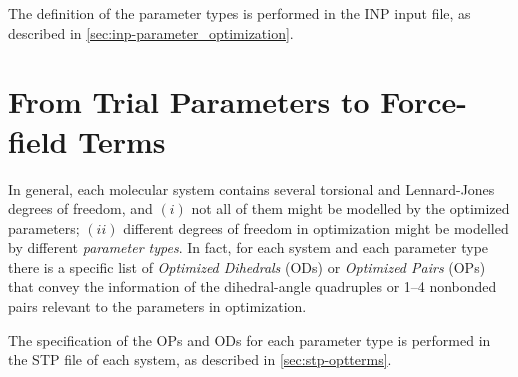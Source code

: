\documentclass[10pt,a4paper,openany]{memoir}
\numberwithin{equation}{section}
\newcommand{\profileropt}[0]{\texttt{profilerOpt}}
\newcommand{\profilergen}[0]{\texttt{profilerGen}}
\begin{document}
The definition of the parameter types is performed in the INP input
file, as described in \autoref{sec:inp-parameter_optimization}.

\section{From Trial Parameters to Force-field Terms}
\label{sec:ga-opt-control}

In general, each molecular system contains several torsional and
Lennard-Jones degrees of freedom, and $(i)$ not all of them might be
modelled by the optimized parameters; $(ii)$ different
degrees of freedom in optimization might be modelled by different
\textit{parameter types}.
%
In fact, for each system and each parameter type there is a specific
list of \textit{Optimized Dihedrals} (ODs) or \textit{Optimized Pairs}
(OPs) that convey the information of the dihedral-angle quadruples or
1--4 nonbonded pairs relevant to the parameters in optimization.

The specification of the OPs and ODs for each parameter type is
performed in the STP file of each system, as described in
\autoref{sec:stp-optterms}.

% 
% 
\end{document}
